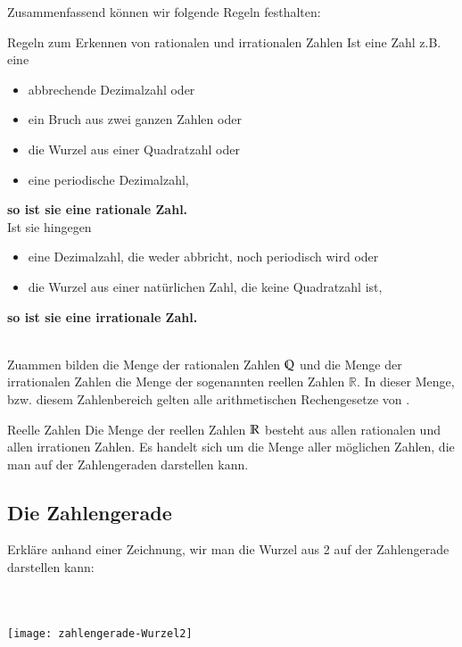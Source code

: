 Zusammenfassend können wir folgende Regeln festhalten:

\begin{law}{Regeln zum Erkennen von rationalen und irrationalen Zahlen}
	Ist eine Zahl z.B. eine
	\begin{itemize}\setlength\itemsep{0pt}
		\item abbrechende Dezimalzahl oder
		\item ein Bruch aus zwei ganzen Zahlen oder
		\item die Wurzel aus einer Quadratzahl oder
		\item eine periodische Dezimalzahl,
	\end{itemize}
	{\bfseries so ist sie eine rationale Zahl.}\\
	Ist sie hingegen
    \begin{itemize}\setlength\itemsep{0pt}
		\item eine Dezimalzahl, die weder abbricht, noch periodisch wird oder
		\item die Wurzel aus einer natürlichen Zahl, die keine Quadratzahl ist,
	\end{itemize}
	{\bfseries so ist sie eine irrationale Zahl.}
\end{law}

~\\
Zuammen bilden die Menge der rationalen Zahlen $\mathbb{Q}$ und die Menge der irrationalen Zahlen die Menge der sogenannten reellen Zahlen $\mathbb{R}$.
In dieser Menge, bzw. diesem Zahlenbereich gelten alle arithmetischen Rechengesetze von \pageref{law:arithmetic}.\\

\begin{defn}{Reelle Zahlen}
	Die Menge der reellen Zahlen $\mathbb{R}$ besteht aus allen rationalen und allen irrationen Zahlen.
	Es handelt sich um die Menge aller möglichen Zahlen, die man auf der Zahlengeraden darstellen kann.
\end{defn}

\subsection{Die Zahlengerade}
\begin{minipage}[t]{.5\linewidth}
 Erkläre anhand einer Zeichnung, wir man die Wurzel aus 2 auf der Zahlengerade darstellen kann:
\end{minipage}
\hfill
\begin{minipage}[t]{.45\linewidth}
~\\\vspace{-1.5cm}\\
 \texttt{[image: zahlengerade-Wurzel2]}
\end{minipage}


